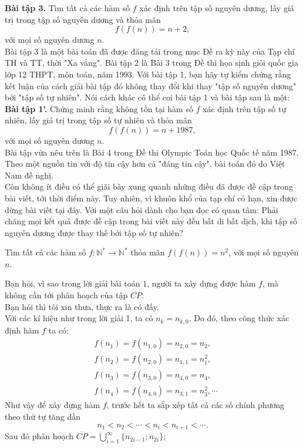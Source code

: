 {\bf Bài tập 3.} Tìm tất cả các hàm số $f$ xác định trên tập số nguyên dương, lấy giá trị trong tập số nguyên dương và thỏa mãn $$f(f(n))=n+2,$$ với mọi số nguyên dương $n$.\\
Bài tập 3 là một bài toán đã được đăng tải trong mục Đề ra kỳ này của Tạp chí TH và TT, thời "Xa vắng". Bài tập 2 là Bài 3 trong Đề thi họa sịnh giỏi quốc gia lớp 12 THPT, môn toán, năm 1993. Với bài tập 1, bạn hãy tự kiểm chứng rằng kết luận của cách giải bài tập đó không thay đổi khi thay "tập số nguyên dương" bởi "tập số tự nhiên". Nói cách khác có thể coi bài tập 1 và bài tập sau là một:\\
{\bf Bài tập 1'.} Chứng minh rằng không tồn tại hàm số $f$ xác định trên tập số tự nhiên, lấy giá trị trong tập số tự nhiên và thỏa mãn $$f(f(n))=n+1987,$$ với mọi số nguyên dương $n$.\\
Bài tập vừa nêu trên là Bài 4 trong Đề thi Olympic Toán học Quốc tế năm 1987. Theo một nguồn tin với độ tin cậy hơn cả "đáng tin cậy", bài toán đó do Việt Nam đề nghị.\\
Còn không ít điều có thể giãi bày  xung quanh những điều đã được đề cập trong bài viết, tới thời điểm này. Tuy nhiên, vì khuôn khổ của tạp chí có hạn, xin được dừng bài viết tại đây. Với một câu hỏi dành cho bạn đọc có quan tâm: Phải chăng mọi kết quả được đề cập trong bài viết này đều bất di bất dịch, khi tập số nguyên dương được thay thế bởi tập số tự nhiên?
\begin{bt}
	Tìm tất cả các hàm số $f:\mathbb{N}^*\rightarrow\mathbb{N}^*$ thỏa mãn $f(f(n))=n^2$, với mọi số nguyên $n$.
\end{bt}
\noindent Bạn hỏi, vì sao trong lời giải bài toán $1$, người ta xây dựng được hàm $f$, mà không cần tới phân hoạch của tập $\overline{CP}$.\\
Bạn hỏi thì tôi xin thưa, thực ra là có đấy.\\
Với các kí hiệu như trong lời giải 1, ta có $n_k=n_{k,0}$. Do đó, theo công thức xác định hàm $f$ ta có:
\begin{align*}
&f(n_1)=f(n_{1,0})=n_{2,0}=n_2,\\
&f(n_2)=f(n_{2,0})=n_{1,1}=n_1^2,\\
&f(n_3)=f(n_{3,0})=n_{4,0}=n_4,\\
&f(n_4)=f(n_{4,0})=n_{3,1}=n_3^2,\cdots
\end{align*} 
\noindent Như vậy để xây dựng hàm $f$, trước hết ta sắp xếp tất cả các số chính phương theo thứ tự tăng dần $$n_1<n_2<\cdots<n_i<n_{i+1}<\cdots.$$
\noindent Sau đó phân hoạch 
$\overline{CP}=\bigcup\limits_{i=1}^{\infty}\{n_{2i-1};n_{2i}\}$; 
